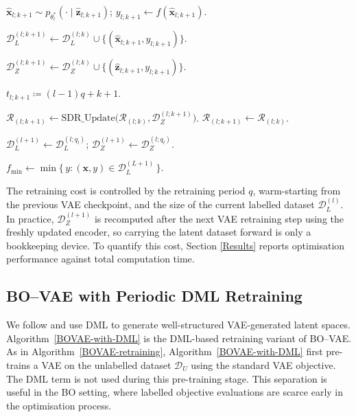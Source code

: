 \documentclass[pdflatex,sn-mathphys-num]{sn-jnl}%
\theoremstyle{thmstyleone}%
\theoremstyle{thmstyletwo}%
\theoremstyle{thmstylethree}%
\begin{document}
\begin{algorithm}
\begin{algorithmic}[1]
    \State
    \(\hat{\mathbf x}_{l;k+1}
    \sim
    p_{\theta_l^\ast}(\cdot\mid\hat{\mathbf z}_{l;k+1})\);
    \quad
    \(y_{l;k+1}\gets f(\hat{\mathbf x}_{l;k+1})\).

    \State
    \(\mathcal D_L^{(l;k+1)}
    \gets
    \mathcal D_L^{(l;k)}
    \cup
    \{(\hat{\mathbf x}_{l;k+1},y_{l;k+1})\}\).

    \State
    \(\mathcal D_Z^{(l;k+1)}
    \gets
    \mathcal D_Z^{(l;k)}
    \cup
    \{(\hat{\mathbf z}_{l;k+1},y_{l;k+1})\}\).

    \State \(t_{l;k+1}\coloneq (l-1)q+k+1\).

      \State
      \(\mathcal R_{(l;k+1)}
      \gets
      \mathrm{SDR\_Update}
      \bigl(\mathcal R_{(l;k)},\mathcal D_Z^{(l;k+1)}\bigr)\).
    \Else
      \State
      \(\mathcal R_{(l;k+1)}
      \gets
      \mathcal R_{(l;k)}\).
    \EndIf

  \EndFor
  \label{alg:inner-end}

  \State
  \(\mathcal D_L^{(l+1)}
  \gets
  \mathcal D_L^{(l;q_l)}\);
  \quad
  \(\mathcal D_Z^{(l+1)}
  \gets
  \mathcal D_Z^{(l;q_l)}\).

\EndFor
\label{alg:outer-end}

\State
\Return
\(f_{\min}
\gets
\min\{\,y:(\mathbf x,y)\in\mathcal D_L^{(L+1)}\,\}\).

\end{algorithmic}
\end{algorithm}
The retraining cost is controlled by the retraining period \(q\), warm-starting from the previous VAE checkpoint, and the size of the current labelled dataset \(\mathcal D_L^{(l)}\). In practice, \(\mathcal D_Z^{(l+1)}\) is recomputed after the next VAE retraining step using the freshly updated encoder, so carrying the latent dataset forward is only a bookkeeping device. To quantify this cost, Section \ref{Results} reports optimisation performance against total computation time.

\subsection{BO--VAE with Periodic DML Retraining}
We follow \cite{grosnit2021highdimensionalbayesianoptimisationvariational} and use DML to generate well-structured VAE-generated latent spaces. Algorithm~\ref{BOVAE-with-DML} is the DML-based retraining variant of BO--VAE. As in Algorithm~\ref{BOVAE-retraining}, Algorithm~\ref{BOVAE-with-DML} first pre-trains a VAE on the unlabelled dataset \(\mathcal D_U\) using the standard VAE objective. The DML term is not used during this pre-training stage. This separation is useful in the BO setting, where labelled objective evaluations are scarce early in the optimisation process.
\end{document}
